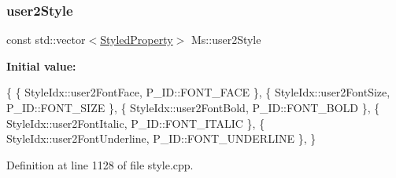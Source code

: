 \subsubsection{\texorpdfstring{user2\+Style}{user2Style}}
{\footnotesize\ttfamily const std\+::vector$<$\hyperlink{struct_ms_1_1_styled_property}{Styled\+Property}$>$ Ms\+::user2\+Style}

{\bfseries Initial value\+:}
\begin{DoxyCode}
\{
      \{ StyleIdx::user2FontFace,                      P\_ID::FONT\_FACE              \},
      \{ StyleIdx::user2FontSize,                      P\_ID::FONT\_SIZE              \},
      \{ StyleIdx::user2FontBold,                      P\_ID::FONT\_BOLD              \},
      \{ StyleIdx::user2FontItalic,                    P\_ID::FONT\_ITALIC            \},
      \{ StyleIdx::user2FontUnderline,                 P\_ID::FONT\_UNDERLINE         \},
      \}
\end{DoxyCode}


Definition at line 1128 of file style.\+cpp.

